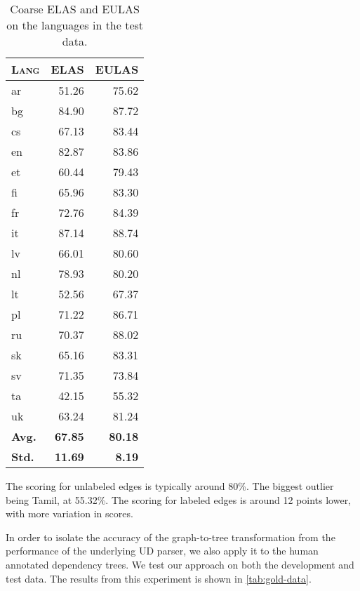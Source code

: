 \documentclass[11pt,a4paper]{article}
\begin{document}
\begin{table}[h]
	\centering
	\begin{tabular}{l|rr}
		\textsc{Lang} & \textsc{ELAS} & \textsc{EULAS} \\
		\hline
		ar  & 51.26 & 75.62 \\
		bg  & 84.90 & 87.72\\
		cs  & 67.13 & 83.44 \\
		en  & 82.87 & 83.86 \\
		et  & 60.44 & 79.43 \\
		fi  & 65.96 & 83.30 \\
		fr  & 72.76 & 84.39 \\
		it  & 87.14 & 88.74 \\
		lv  & 66.01 & 80.60 \\
		nl  & 78.93 & 80.20 \\
		lt  & 52.56 & 67.37 \\
		pl  & 71.22 & 86.71 \\
		ru  & 70.37 & 88.02 \\
		sk  & 65.16 & 83.31 \\
		sv  & 71.35 & 73.84 \\
		ta  & 42.15 & 55.32 \\
		uk  & 63.24 & 81.24 \\
		\textbf{Avg.} & \textbf{67.85} & \textbf{80.18} \\
        \textbf{Std.} & \textbf{11.69} & \textbf{8.19} \\
	\end{tabular}
\caption{\label{tab:test} Coarse ELAS and EULAS on the languages in the test data.}
\end{table}

The scoring for unlabeled edges is typically around 80\%. The biggest
outlier being Tamil, at 55.32\%. The scoring for labeled edges is
around 12 points lower, with more variation in scores.

In order to isolate the accuracy of the graph-to-tree transformation
from the performance of the underlying UD parser, we also apply it to
the human annotated dependency trees. We test our approach on both the
development and test data. The results from this experiment is shown
in \cref{tab:gold-data}.
\end{document}
